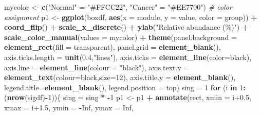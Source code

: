 \documentclass[
]{article}
\newenvironment{Shaded}{\begin{snugshade}}{\end{snugshade}}
\newcommand{\AttributeTok}[1]{\textcolor[rgb]{0.13,0.29,0.53}{#1}}
\newcommand{\CommentTok}[1]{\textcolor[rgb]{0.56,0.35,0.01}{\textit{#1}}}
\newcommand{\ConstantTok}[1]{\textcolor[rgb]{0.56,0.35,0.01}{#1}}
\newcommand{\ControlFlowTok}[1]{\textcolor[rgb]{0.13,0.29,0.53}{\textbf{#1}}}
\newcommand{\DecValTok}[1]{\textcolor[rgb]{0.00,0.00,0.81}{#1}}
\newcommand{\FloatTok}[1]{\textcolor[rgb]{0.00,0.00,0.81}{#1}}
\newcommand{\FunctionTok}[1]{\textcolor[rgb]{0.13,0.29,0.53}{\textbf{#1}}}
\newcommand{\NormalTok}[1]{#1}
\newcommand{\OtherTok}[1]{\textcolor[rgb]{0.56,0.35,0.01}{#1}}
\newcommand{\SpecialCharTok}[1]{\textcolor[rgb]{0.81,0.36,0.00}{\textbf{#1}}}
\newcommand{\StringTok}[1]{\textcolor[rgb]{0.31,0.60,0.02}{#1}}
\begin{document}
\begin{Shaded}
\begin{Highlighting}[]
\NormalTok{mycolor }\OtherTok{\textless{}{-}} \FunctionTok{c}\NormalTok{(}\StringTok{"Normal"} \OtherTok{=} \StringTok{"\#FFCC22"}\NormalTok{, }\StringTok{"Cancer"} \OtherTok{=} \StringTok{"\#EE7700"}\NormalTok{) }\CommentTok{\# color assignment}
\NormalTok{p1 }\OtherTok{\textless{}{-}} \FunctionTok{ggplot}\NormalTok{(boxdf, }\FunctionTok{aes}\NormalTok{(}\AttributeTok{x =}\NormalTok{ module, }\AttributeTok{y =}\NormalTok{ value, }\AttributeTok{color =}\NormalTok{ group)) }\SpecialCharTok{+}  \FunctionTok{coord\_flip}\NormalTok{() }\SpecialCharTok{+}
      \FunctionTok{scale\_x\_discrete}\NormalTok{() }\SpecialCharTok{+}
      \FunctionTok{ylab}\NormalTok{(}\StringTok{"Relative abundance (\%)"}\NormalTok{) }\SpecialCharTok{+} \FunctionTok{scale\_color\_manual}\NormalTok{(}\AttributeTok{values =}\NormalTok{ mycolor) }\SpecialCharTok{+}
      \FunctionTok{theme}\NormalTok{(}\AttributeTok{panel.background =} \FunctionTok{element\_rect}\NormalTok{(}\AttributeTok{fill =} \StringTok{\textquotesingle{}transparent\textquotesingle{}}\NormalTok{),}
        \AttributeTok{panel.grid =} \FunctionTok{element\_blank}\NormalTok{(),}
        \AttributeTok{axis.ticks.length =} \FunctionTok{unit}\NormalTok{(}\FloatTok{0.4}\NormalTok{,}\StringTok{"lines"}\NormalTok{),}
        \AttributeTok{axis.ticks =} \FunctionTok{element\_line}\NormalTok{(}\AttributeTok{color=}\StringTok{\textquotesingle{}black\textquotesingle{}}\NormalTok{),}
        \AttributeTok{axis.line =} \FunctionTok{element\_line}\NormalTok{(}\AttributeTok{colour =} \StringTok{"black"}\NormalTok{),}
        \AttributeTok{axis.text.y =} \FunctionTok{element\_text}\NormalTok{(}\AttributeTok{colour=}\StringTok{\textquotesingle{}black\textquotesingle{}}\NormalTok{,}\AttributeTok{size=}\DecValTok{12}\NormalTok{),}
        \AttributeTok{axis.title.y =} \FunctionTok{element\_blank}\NormalTok{(),}
        \AttributeTok{legend.title=}\FunctionTok{element\_blank}\NormalTok{(),}
        \AttributeTok{legend.position =} \StringTok{\textquotesingle{}top\textquotesingle{}}\NormalTok{)}
\NormalTok{sing }\OtherTok{=} \DecValTok{1}
\ControlFlowTok{for}\NormalTok{ (i }\ControlFlowTok{in} \DecValTok{1}\SpecialCharTok{:}\NormalTok{(}\FunctionTok{nrow}\NormalTok{(sigdf)}\SpecialCharTok{{-}}\DecValTok{1}\NormalTok{))\{}
\NormalTok{  sing }\OtherTok{=}\NormalTok{ sing }\SpecialCharTok{*} \SpecialCharTok{{-}}\DecValTok{1}
\NormalTok{  p1 }\OtherTok{\textless{}{-}}\NormalTok{ p1 }\SpecialCharTok{+} \FunctionTok{annotate}\NormalTok{(}\StringTok{\textquotesingle{}rect\textquotesingle{}}\NormalTok{, }\AttributeTok{xmin =}\NormalTok{ i}\FloatTok{+0.5}\NormalTok{, }\AttributeTok{xmax =}\NormalTok{ i}\FloatTok{+1.5}\NormalTok{, }\AttributeTok{ymin =} \SpecialCharTok{{-}}\ConstantTok{Inf}\NormalTok{, }\AttributeTok{ymax =} \ConstantTok{Inf}\NormalTok{,}

\end{Highlighting}
\end{Shaded}
\end{document}
